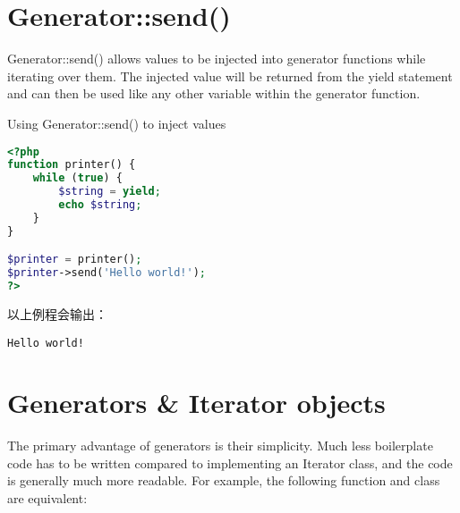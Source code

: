\section{Generator::send()}

Generator::send() allows values to be injected into generator functions while iterating over them. The injected value will be returned from the yield statement and can then be used like any other variable within the generator function.


\begin{example}
Using Generator::send() to inject values
\begin{lstlisting}[language=PHP]
<?php
function printer() {
    while (true) {
        $string = yield;
        echo $string;
    }
}

$printer = printer();
$printer->send('Hello world!');
?>
\end{lstlisting}
\end{example}

以上例程会输出：

\begin{verbatim}
Hello world!
\end{verbatim}


\section{Generators \& Iterator objects}

The primary advantage of generators is their simplicity. Much less boilerplate code has to be written compared to implementing an Iterator class, and the code is generally much more readable. For example, the following function and class are equivalent:


